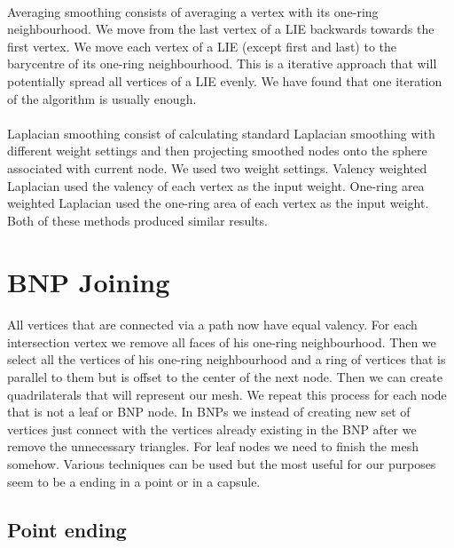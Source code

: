 \paragraph{}
Averaging smoothing consists of averaging a vertex with its one-ring neighbourhood. We move from the last vertex of a LIE backwards towards the first vertex. We move each vertex of a LIE (except first and last) to the barycentre of its one-ring neighbourhood. This is a iterative approach that will potentially spread all vertices of a LIE evenly. We have found that one iteration of the algorithm is usually enough.
\paragraph{}
Laplacian smoothing consist of calculating standard Laplacian smoothing with different weight settings and then projecting smoothed nodes onto the sphere associated with current node. We used two weight settings. Valency weighted Laplacian used the valency of each vertex as the input weight. One-ring area weighted Laplacian used the one-ring area of each vertex as the input weight. Both of these methods produced similar results.

\section{BNP Joining}

\paragraph{}
All vertices that are connected via a path now have equal valency. For each intersection vertex we remove all faces of his one-ring neighbourhood. Then we select all the vertices of his one-ring neighbourhood and a ring of vertices that is parallel to them but is offset to the center of the next node. Then we can create quadrilaterals that will represent our mesh. We repeat this process for each node that is not a leaf or BNP node. In BNPs we instead of creating new set of vertices just connect with the vertices already existing in the BNP after we remove the unnecessary triangles. For leaf nodes we need to finish the mesh somehow. Various techniques can be used but the most useful for our purposes seem to be a ending in a point or in a capsule.

\subsection{Point ending}
